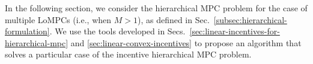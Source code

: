 In the following section, we consider the hierarchical MPC problem for the case of multiple LoMPCs (i.e., when $M > 1$), as defined in Sec.~\ref{subsec:hierarchical-formulation}.
We use the tools developed in Secs.~\ref{sec:linear-incentives-for-hierarchical-mpc} and \ref{sec:linear-convex-incentives} to propose an algorithm that solves a particular case of the incentive hierarchical MPC problem.

